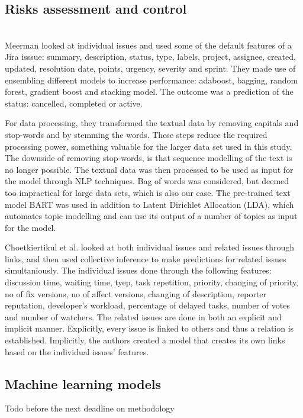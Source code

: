 \documentclass[sigconf]{acmart}
\begin{document}
\subsection{Risks assessment and control} \\
Meerman\cite{meerman2022risk} looked at individual issues and used some of the default features of a Jira isssue: summary, description, status, type, labels, project, assignee, created, updated, resolution date, points, urgency, severity and sprint.
They made use of ensembling different models to increase performance: adaboost, bagging, random forest, gradient boost and stacking model.
The outcome was a prediction of the status: cancelled, completed or active.

For data processing, they transformed the textual data by removing capitals and stop-words and by stemming the words. 
These steps reduce the required processing power, something valuable for the larger data set used in this study.
The downside of removing stop-words, is that sequence modelling of the text is no longer possible.
The textual data was then processed to be used as input for the model through NLP techniques. Bag of words was considered, but deemed too impractical for large data sets, which is also our case.
The pre-trained text model BART was used in addition to Latent Dirichlet Allocation (LDA), which automates topic modelling and can use its output of a number of topics as input for the model.

Choetkiertikul et al.\cite{choetkiertikul2017predicting} looked at both individual issues and related issues through links, and then used collective inference to make predictions for related issues simultaniously. 
The individual issues done through the following features: discussion time, waiting time, tyep, task repetition, priority, changing of priority, no of fix versions, no of affect versions, changing of description, reporter reputation, developer's workload, percentage of delayed tasks, number of votes and number of watchers.
The related issues are done in both an explicit and implicit manner. Explicitly, every issue is linked to others and thus a relation is established. Implicitly, the authors created a model that creates its own links based on the individual issues' features.

\subsection{Machine learning models}
Todo before the next deadline on methodology
\end{document}
